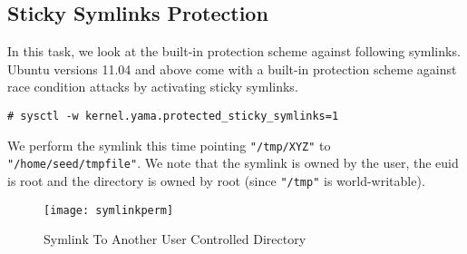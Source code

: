 \documentclass[a4paper,12pt]{article}
\begin{document}
\subsection{Sticky Symlinks Protection}
In this task, we look at the built-in protection scheme against following symlinks. Ubuntu versions 11.04 and above come with a built-in protection scheme against race condition attacks by activating sticky symlinks.\vspace{0.7em}
\begin{verbatim}
# sysctl -w kernel.yama.protected_sticky_symlinks=1
\end{verbatim}
\vspace{0.7em}
We perform the symlink this time pointing \texttt{"/tmp/XYZ"} to \texttt{"/home/seed/tmpfile"}. We note that the symlink is owned by the user, the euid is root and the directory is owned by root (since \texttt{"/tmp"} is world-writable). 
\begin{figure}[H]
	\centering
	\texttt{[image: symlinkperm]}
	\caption{Symlink To Another User Controlled Directory}
	\label{fig:symlinkperm}
\end{figure}
\end{document}
